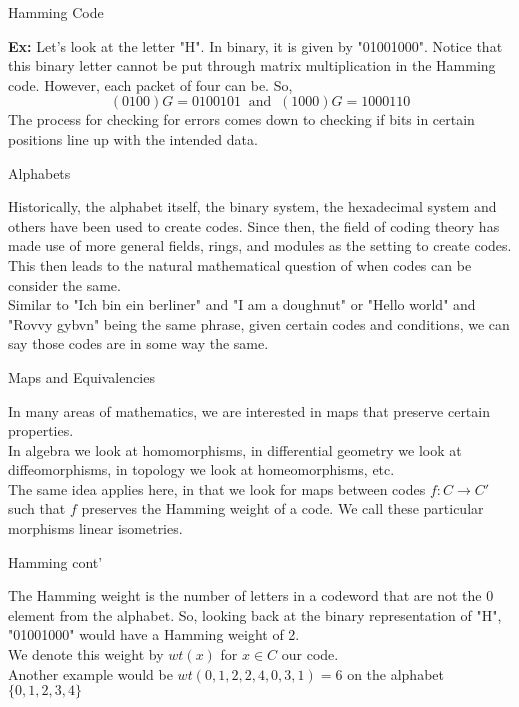 \documentclass{beamer}
\begin{document}
\begin{frame}{Hamming Code}
    
    \textbf{Ex:} Let's look at the letter "H". In binary, it is given by "01001000". Notice that this
    binary letter cannot be put through matrix multiplication in the Hamming code. However, each packet
    of four can be. So,
    $$(0 1 0 0)G=0100101\;\;\text{and}\;\; (1 0 0 0)G=1000110$$
    The process for checking for errors comes down to checking if bits in certain positions line up with
    the intended data.

\end{frame}

\begin{frame}{Alphabets}

    Historically, the alphabet itself, the binary system, the hexadecimal system and others have been
    used to create codes. Since then, the field of coding theory has made use of more general fields,
    rings, and modules as the setting to create codes.\\
    This then leads to the natural mathematical question of when codes can be consider the same.\\
    Similar to "Ich bin ein berliner" and "I am a doughnut" or "Hello world" and "Rovvy gybvn" being the
    same phrase, given certain codes and conditions, we can say those codes are in some way the same.
    
\end{frame}

\begin{frame}{Maps and Equivalencies}
    
    In many areas of mathematics, we are interested in maps that preserve certain properties.\\
    In algebra we look at homomorphisms, in differential geometry we look at diffeomorphisms, in
    topology we look at homeomorphisms, etc.\\
    The same idea applies here, in that we look for maps between codes $f:C\to C'$ such that $f$
    preserves the Hamming weight of a code. We call these particular morphisms linear isometries. 

\end{frame}

\begin{frame}{Hamming cont'}
    
    The Hamming weight is the number of letters in a codeword that are not the $0$ element from the
    alphabet. So, looking back at the binary representation of "H", "01001000" would have a Hamming
    weight of 2.\\
    We denote this weight by $wt(x)$ for $x\in C$ our code.\\
    Another example would be $wt(0,1,2,2,4,0,3,1)=6$ on the alphabet $\{0,1,2,3,4\}$

\end{frame}
\end{document}
